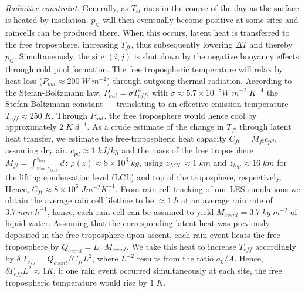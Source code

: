 \documentclass[draft,linenumbers]{agujournal2019}
\begin{document}
\noindent
{\it Radiative constraint.}
Generally, as $T_{bl}$ rises in the course of the day as the surface is heated by insolation. 
$p_{ij}$ will then eventually become positive at some sites and raincells can be produced there.
When this occurs, latent heat is transferred to the free troposphere, increasing $T_{ft}$, thus subsequently lowering $\Delta T$ and thereby $p_{ij}$.
Simultaneously, the site $(i,j)$ is shut down by the negative buoyancy effects through cold pool formation.
The free tropospheric temperature will relax by heat loss ($P_{out}\approx 200\;W\;m^{-2}$) through outgoing thermal radiation. 
According to the Stefan-Boltzmann law, $P_{out}=\sigma T_{eff}^4$, with $\sigma\approx 5.7\times 10^{-8}W\;m^{-2}\;K^{-4}$ the Stefan-Boltzmann constant --- translating to an effective emission temperature $T_{eff}\approx 250\;K$. 
Through $P_{out}$, the free troposphere would hence cool by approximately $2\;K\;d^{-1}$.
As a crude estimate of the change in $T_{ft}$ through latent heat transfer, we estimate the free-tropospheric heat capacity $C_{ft}=M_{ft}c_{pd}$, assuming dry air.
$c_{pd}\approx 1\;kJ/kg$ and the mass of the free troposphere $M_{ft}=\int_{z=z_{LCL}}^{z_{top}}dz\;\rho(z)\approx 8\times 10^3\;kg$, using $z_{LCL}\approx 1\;km$ and $z_{top}\approx 16\;km$ for the lifting condensation level (LCL) and top of the troposphere, respectively.
Hence, $C_{ft}\approx 8\times 10^6\;Jm^{-2}K^{-1}$.
From rain cell tracking of our LES simulations we obtain the average rain cell lifetime to be $\approx 1\;h$ at an average rain rate of $3.7\;mm\;h^{-1}$, hence, each rain cell can be assumed to yield $M_{event}=3.7\;kg\;m^{-2}$ of liquid water.
Assuming that the corresponding latent heat was previously deposited in the free troposphere upon ascent, each rain event heats the free troposphere by $Q_{event}=L_v\;M_{event}$.
We take this heat to increase $T_{eff}$ accordingly by $\delta\;T_{eff}=Q_{event}/C_{ft}L^{2}$, where $L^{-2}$ results from the ratio $a_0/A$.
Hence, $\delta T_{eff}L^2\approx 1K$, if one rain event occurred simultaneously at each site, the free tropospheric temperature would rise by $1\;K$.

\end{document}
